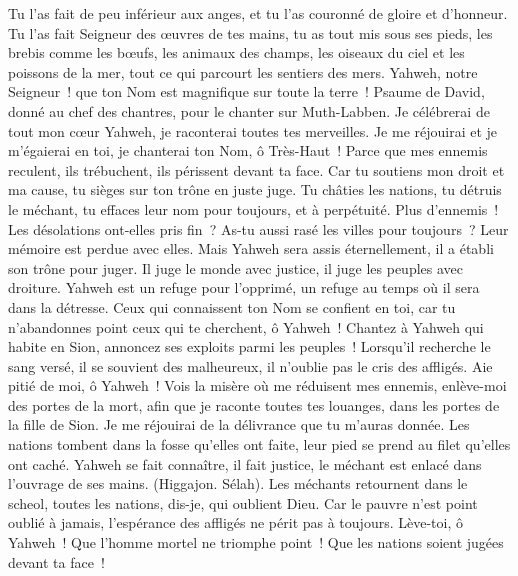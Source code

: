 \begin{multicols}{2}
Tu l'as fait de peu inférieur aux anges, et tu l'as couronné de gloire et d'honneur.
Tu l'as fait Seigneur des œuvres de tes mains, tu as tout mis sous ses pieds,
les brebis comme les bœufs, les animaux des champs,
les oiseaux du ciel et les poissons de la mer, tout ce qui parcourt les sentiers des mers.
Yahweh, notre Seigneur~! que ton Nom est magnifique sur toute la terre~!
\VerseOne{}Psaume de David, donné au chef des chantres, pour le chanter sur Muth-Labben.
Je célébrerai de tout mon cœur Yahweh, je raconterai toutes tes merveilles.
Je me réjouirai et je m'égaierai en toi, je chanterai ton Nom, ô Très-Haut~!
Parce que mes ennemis reculent, ils trébuchent, ils périssent devant ta face.
Car tu soutiens mon droit et ma cause, tu sièges sur ton trône en juste juge.
Tu châties les nations, tu détruis le méchant, tu effaces leur nom pour toujours, et à perpétuité.
Plus d'ennemis~! Les désolations ont-elles pris fin~? As-tu aussi rasé les villes pour toujours~? Leur mémoire est perdue avec elles.
Mais Yahweh sera assis éternellement, il a établi son trône pour juger.
Il juge le monde avec justice, il juge les peuples avec droiture.
Yahweh est un refuge pour l'opprimé, un refuge au temps où il sera dans la détresse.
Ceux qui connaissent ton Nom se confient en toi, car tu n'abandonnes point ceux qui te cherchent, ô Yahweh~!
Chantez à Yahweh qui habite en Sion, annoncez ses exploits parmi les peuples~!
Lorsqu'il recherche le sang versé, il se souvient des malheureux, il n'oublie pas le cris des affligés.
Aie pitié de moi, ô Yahweh~! Vois la misère où me réduisent mes ennemis, enlève-moi des portes de la mort,
afin que je raconte toutes tes louanges, dans les portes de la fille de Sion. Je me réjouirai de la délivrance que tu m'auras donnée.
Les nations tombent dans la fosse qu'elles ont faite, leur pied se prend au filet qu'elles ont caché.
Yahweh se fait connaître, il fait justice, le méchant est enlacé dans l'ouvrage de ses mains. (Higgajon. Sélah).
Les méchants retournent dans le scheol, toutes les nations, dis-je, qui oublient Dieu.
Car le pauvre n'est point oublié à jamais, l'espérance des affligés ne périt pas à toujours.
Lève-toi, ô Yahweh~! Que l'homme mortel ne triomphe point~! Que les nations soient jugées devant ta face~!

\end{multicols}
